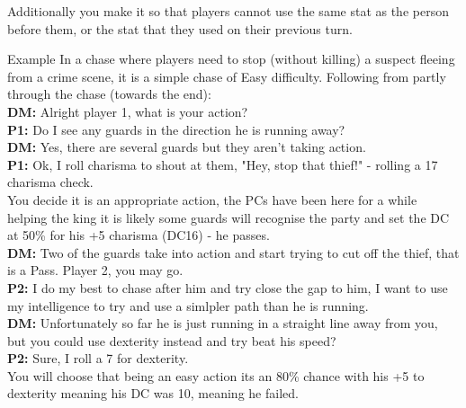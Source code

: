 \documentclass[10pt,twoside,twocolumn]{article}
\begin{document}
Additionally you make it so that players cannot use the same stat as the person before them, or the stat that they used on their previous turn.\\

\begin{paperbox}{Example}
In a chase where players need to stop (without killing) a suspect fleeing from a crime scene, it is a simple chase of Easy difficulty. Following from partly through the chase (towards the end):\\

\textbf{DM:} Alright player 1, what is your action?\\
\textbf{P1:} Do I see any guards in the direction he is running away?\\
\textbf{DM:} Yes, there are several guards but they aren't taking action.\\
\textbf{P1:} Ok, I roll charisma to shout at them, "Hey, stop that thief!" - rolling a 17 charisma check.\\

You decide it is an appropriate action, the PCs have been here for a while helping the king it is likely some guards will recognise the party and set the DC at 50\% for his +5 charisma (DC16) - he passes.\\

\textbf{DM:} Two of the guards take into action and start trying to cut off the thief, that is a Pass. Player 2, you may go.\\
\textbf{P2:} I do my best to chase after him and try close the gap to him, I want to use my intelligence to try and use a simlpler path than he is running.\\
\textbf{DM:} Unfortunately so far he is just running in a straight line away from you, but you could use dexterity instead and try beat his speed?\\
\textbf{P2:} Sure, I roll a 7 for dexterity.\\

You will choose that being an easy action its an 80\% chance with his +5 to dexterity meaning his DC was 10, meaning he failed.\\


\end{paperbox}
\end{document}
